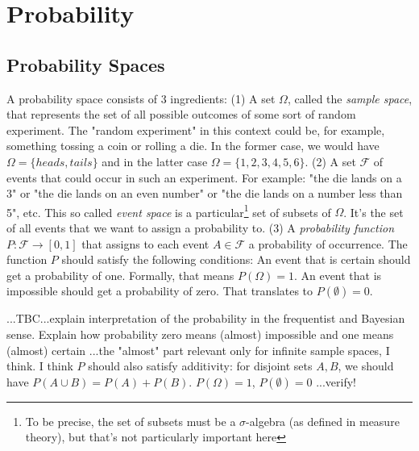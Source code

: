 \section{Probability}


\subsection{Probability Spaces}
A probability space consists of 3 ingredients: (1) A set $\Omega$, called the \emph{sample space}, that represents the set of all possible outcomes of some sort of random experiment. The "random experiment" in this context could be, for example, something tossing a coin or rolling a die. In the former case, we would have $\Omega = \{heads, tails\}$ and in the latter case $\Omega = \{1,2,3,4,5,6\}$. (2) A set $\mathcal{F}$ of events that could occur in such an experiment. For example: "the die lands on a 3" or "the die lands on an even number" or "the die lands on a number less than 5", etc. This so called \emph{event space} is a particular\footnote{To be precise, the set of subsets must be a $\sigma$-algebra (as defined in measure theory), but that's not particularly important here} set of subsets of $\Omega$. It's the set of all events that we want to assign a probability to. (3) A \emph{probability function} $P: \mathcal{F} \rightarrow [0,1]$ that assigns to each event $A \in \mathcal{F}$ a probability of occurrence. The function $P$ should satisfy the following conditions: An event that is certain should get a probability of one. Formally, that means $P(\Omega) = 1$. An event that is impossible should get a probability of zero. That translates to $P(\emptyset) = 0$.

...TBC...explain interpretation of the probability in the frequentist and Bayesian sense. Explain how probability zero means (almost) impossible and one means (almost) certain ...the "almost" part relevant only for infinite sample spaces, I think. I think $P$ should also satisfy additivity: for disjoint sets $A,B$, we should have $P(A \cup B) = P(A) + P(B)$. $P(\Omega) = 1$, $P(\emptyset) = 0$ ...verify!








\begin{comment}

Probability is just...really weird
https://www.youtube.com/watch?v=zczGnnM05TQ

\end{comment}

